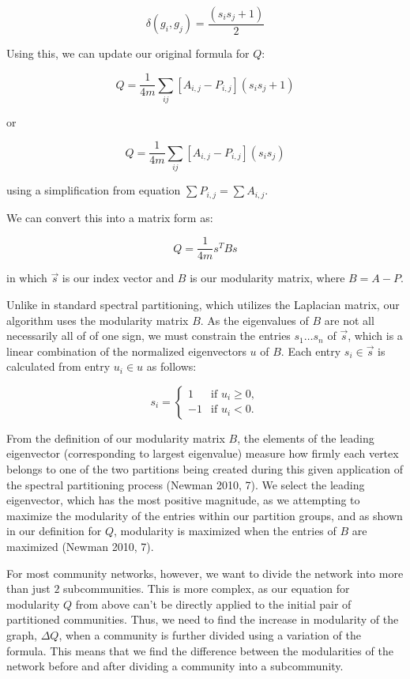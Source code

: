 \documentclass{article}
\begin{document}
$$\delta (g_i, g_j) = \dfrac{(s_i s_j + 1)}{2}  $$

\bigskip 

Using this, we can update our original formula for $Q$:

$$ Q = \dfrac{1}{4m}\sum_{ij} [A_{i,j} - P_{i,j}](s_i s_j + 1) $$

or 

$$ Q = \dfrac{1}{4m}\sum_{ij} [A_{i,j} - P_{i,j}](s_i s_j) $$

using a simplification from equation $\sum P_{i,j} = \sum A_{i,j}$. 

\bigskip 

We can convert this into a matrix form as:

$$ Q = \dfrac{1}{4m}s^T B s $$

in which $\vec{s}$ is our index vector and $B$ is our modularity matrix, where $B = A - P$.

\bigskip

Unlike in standard spectral partitioning, which utilizes the Laplacian matrix, our algorithm uses the modularity matrix $B$.
As the eigenvalues of $B$ are not all necessarily all of of one sign, we must constrain the entries $s_1 \dots s_n$ of $\vec{s}$, 
which is a linear combination of the normalized eigenvectors $u$ of $B$. 
Each entry $s_i \in \vec{s}$ is calculated from entry $u_i \in u$ as follows:

\bigskip

\indent \[s_i = 
  \begin{cases}
    1 & \text{if } u_{i} \geq 0, \\
    -1 & \text{if } u_{i} < 0.   
  \end{cases} \]

\bigskip

From the definition of our modularity matrix $B$, the elements of the leading eigenvector (corresponding to largest eigenvalue)
measure how firmly each vertex belongs to one of the two partitions being created during this given application of the spectral partitioning process (Newman 2010, 7).
We select the leading eigenvector, which has the most positive magnitude, as we attempting to maximize the modularity of the entries within our partition groups, and as shown in our definition for $Q$, 
modularity is maximized when the entries of $B$ are maximized (Newman 2010, 7).

For most community networks, however, we want to divide the network into more than just $2$ subcommunities.
This is more complex, as our equation for modularity $Q$ from above can't be directly applied to the initial pair of partitioned communities.
Thus, we need to find the increase in modularity of the graph, $\Delta Q$, when a community is further divided using a variation of the formula.
This means that we find the difference between the modularities of the network before and after dividing a community into a subcommunity. 
\end{document}

